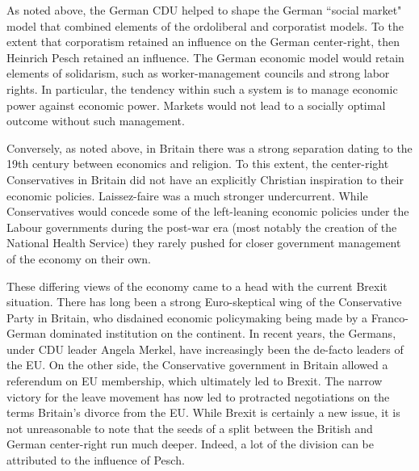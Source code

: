 \documentclass{article}
\begin{document}
As noted above, the German CDU helped to shape the German ``social market" model that combined elements of the ordoliberal and corporatist models.  To the extent that corporatism retained an influence on the German center-right, then Heinrich Pesch retained an influence.  The German economic model would retain elements of solidarism, such as worker-management councils and strong labor rights.  In particular, the tendency within such a system is to manage economic power against economic power.  Markets would not lead to a socially optimal outcome without such management.\medskip

Conversely, as noted above, in Britain there was a strong separation dating to the 19th century between economics and religion.  To this extent, the center-right Conservatives in Britain did not have an explicitly Christian inspiration to their economic policies.  Laissez-faire was a much stronger undercurrent.  While Conservatives would concede some of the left-leaning economic policies under the Labour governments during the post-war era (most notably the creation of the National Health Service) they rarely pushed for closer government management of the economy on their own.\medskip

These differing views of the economy came to a head with the current Brexit situation.  There has long been a strong Euro-skeptical wing of the Conservative Party in Britain, who disdained economic policymaking being made by a Franco-German dominated institution on the continent.  In recent years, the Germans, under CDU leader Angela Merkel, have increasingly been the de-facto leaders of the EU.  On the other side, the Conservative government in Britain allowed a referendum on EU membership, which ultimately led to Brexit.  The narrow victory for the leave movement has now led to protracted negotiations on the terms Britain’s divorce from the EU.  While Brexit is certainly a new issue, it is not unreasonable to note that the seeds of a split between the British and German center-right run much deeper.  Indeed, a lot of the division can be attributed to the influence of Pesch.

\printbibliography
\end{document}
